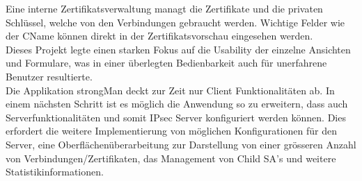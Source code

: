 Eine interne Zertifikatsverwaltung managt die Zertifikate und die privaten Schlüssel, welche von den Verbindungen gebraucht werden. Wichtige Felder wie der CName können direkt in der Zertifikatsvorschau eingesehen werden.\\

Dieses Projekt legte einen starken Fokus auf die Usability der einzelne Ansichten und Formulare, was in einer überlegten Bedienbarkeit auch für unerfahrene Benutzer resultierte.\\

Die Applikation strongMan deckt zur Zeit nur Client Funktionalitäten ab. In einem nächsten Schritt ist es möglich die Anwendung so zu erweitern, dass auch Serverfunktionalitäten und somit IPsec Server konfiguriert werden können. Dies erfordert die weitere Implementierung von möglichen Konfigurationen für den Server, eine Oberflächenüberarbeitung zur Darstellung von einer grösseren Anzahl von Verbindungen/Zertifikaten, das Management von Child SA's und weitere Statistikinformationen.